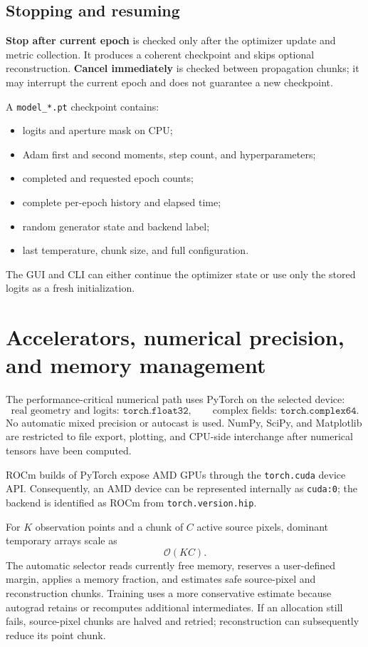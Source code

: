 \documentclass[11pt,a4paper]{article}
\begin{document}
\subsection{Stopping and resuming}
\textbf{Stop after current epoch} is checked only after the optimizer update and metric collection. It produces a coherent checkpoint and skips optional reconstruction. \textbf{Cancel immediately} is checked between propagation chunks; it may interrupt the current epoch and does not guarantee a new checkpoint.

A \texttt{model\_*.pt} checkpoint contains:
\begin{itemize}
  \item logits and aperture mask on CPU;
  \item Adam first and second moments, step count, and hyperparameters;
  \item completed and requested epoch counts;
  \item complete per-epoch history and elapsed time;
  \item random generator state and backend label;
  \item last temperature, chunk size, and full configuration.
\end{itemize}
The GUI and CLI can either continue the optimizer state or use only the stored logits as a fresh initialization.

\section{Accelerators, numerical precision, and memory management}
The performance-critical numerical path uses PyTorch on the selected device:
\begin{equation}
 \text{real geometry and logits: }\texttt{torch.float32},\qquad
 \text{complex fields: }\texttt{torch.complex64}.
\end{equation}
No automatic mixed precision or autocast is used. NumPy, SciPy, and Matplotlib are restricted to file export, plotting, and CPU-side interchange after numerical tensors have been computed.

ROCm builds of PyTorch expose AMD GPUs through the \texttt{torch.cuda} device API. Consequently, an AMD device can be represented internally as \texttt{cuda:0}; the backend is identified as ROCm from \texttt{torch.version.hip}.

For $K$ observation points and a chunk of $C$ active source pixels, dominant temporary arrays scale as
\begin{equation}
 \mathcal O(KC).
\end{equation}
The automatic selector reads currently free memory, reserves a user-defined margin, applies a memory fraction, and estimates safe source-pixel and reconstruction chunks. Training uses a more conservative estimate because autograd retains or recomputes additional intermediates. If an allocation still fails, source-pixel chunks are halved and retried; reconstruction can subsequently reduce its point chunk.
\end{document}
